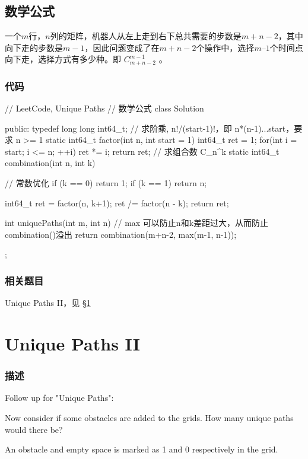 \subsection{数学公式}
一个$m$行，$n$列的矩阵，机器人从左上走到右下总共需要的步数是$m+n-2$，其中向下走的步数是$m-1$，因此问题变成了在$m+n-2$个操作中，选择$m–1$个时间点向下走，选择方式有多少种。即 $C_{m+n-2}^{m-1}$ 。

\subsubsection{代码}
\begin{Code}
// LeetCode, Unique Paths
// 数学公式
class Solution {
public:
    typedef long long int64_t;
    // 求阶乘, n!/(start-1)!，即 n*(n-1)...start，要求 n >= 1
    static int64_t factor(int n, int start = 1) {
        int64_t  ret = 1;
        for(int i = start; i <= n; ++i)
            ret *= i;
        return ret;
    }
    // 求组合数 C_n^k
    static int64_t combination(int n, int k) {
        // 常数优化
        if (k == 0) return 1;
        if (k == 1) return n;

        int64_t ret = factor(n, k+1);
        ret /= factor(n - k);
        return ret;
    }

    int uniquePaths(int m, int n) {
        // max 可以防止n和k差距过大，从而防止combination()溢出
        return combination(m+n-2, max(m-1, n-1));
    }
};
\end{Code}


\subsubsection{相关题目}
\begindot
\item Unique Paths II，见 \S \ref{sec:unique-paths-ii}
\myenddot


\section{Unique Paths II} %
\label{sec:unique-paths-ii}


\subsubsection{描述}
Follow up for "Unique Paths":

Now consider if some obstacles are added to the grids. How many unique paths would there be?

An obstacle and empty space is marked as 1 and 0 respectively in the grid.

